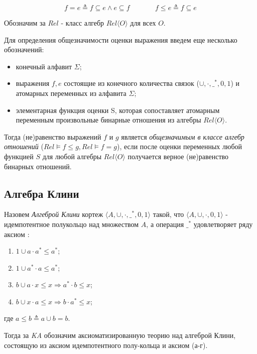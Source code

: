 \documentclass[times
              ,specification
              ,annotation
              ]{itmo-student-thesis}
\begin{document}
      $$ f = e \triangleq f \subseteq e \wedge e \subseteq f \;\;\;\;\;\;\;\;\;\;\;\;\; f \leq e \triangleq f \subseteq e $$

      Обозначим за $\mathit{Rel}$ - класс алгебр $ \mathit{Rel}\langle O \rangle $ для всех $ O $.

      Для определения общезначимости оценки выражения введем еще несколько обозначений:
      \begin{itemize}
        \item конечный алфавит $ \Sigma $;
        \item выражения $ f, e $ состоящие из конечного количества связок
        ($ \cup, \cdot, \_^* , 0, 1 $) и атомарных переменных из алфавита $ \Sigma $;
        \item элементарная функция оценки S, которая сопоставляет атомарным переменным произвольные
          бинарные отношения из алгебры $ Rel \langle O \rangle $.
      \end{itemize}
      Тогда (не)равенство выражений $ f $ и $ g $ является \textit{общезначимым в классе алгебр отношений}
      ($\mathit{Rel} \models f \leq g, \mathit{Rel} \models f = g $),
      если после оценки переменных любой функцией $ S $ для любой алгебры $ \mathit{Rel}\langle O \rangle $
      получается верное (не)равенство бинарных отношений.
      
    \subsection{Алгебра Клини}
      Назовем \textit{Алгеброй Клини} кортеж $\langle A,\cup,\cdot,\_^*,0,1\rangle$ такой, что $\langle A, \cup, \cdot, 0, 1 \rangle$ -
      идемпотентное полукольцо над множеством $A$, а операция $ \_^* $ удовлетворяет ряду аксиом \cite{ka_axioms}:
      \begin{enumerate}
        \item $ 1 \cup a \cdot a^* \leq a^* $;
        \item $ 1 \cup a^* \cdot a \leq a^* $;
        \item $ b \cup a \cdot x \leq x \Rightarrow a^* \cdot b \leq x $;
        \item $ b \cup x \cdot a \leq x \Rightarrow b \cdot a^* \leq x $;
      \end{enumerate}
      где  $ a \leq b \triangleq a \cup b = b$.

      Тогда за \textit{KA} обозначим аксиоматизированную теорию над алгеброй Клини, состоящую из аксиом
      идемпотентного полу-кольца и аксиом (а-г).
\end{document}
